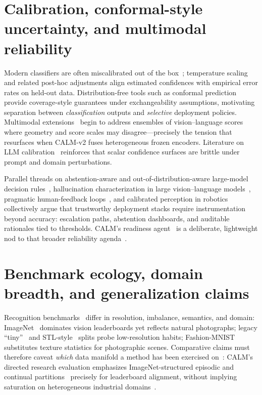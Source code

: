 \documentclass[12pt,a4paper]{report}
\begin{document}
\section{Calibration, conformal-style uncertainty, and multimodal reliability}
Modern classifiers are often miscalibrated out of the box~\cite{r5}; temperature scaling and related post-hoc adjustments align estimated confidences with empirical error rates on held-out data. Distribution-free tools such as conformal prediction~\cite{r10} provide coverage-style guarantees under exchangeability assumptions, motivating separation between \emph{classification} outputs and \emph{selective} deployment policies. Multimodal extensions~\cite{r21} begin to address ensembles of vision--language scores where geometry and score scales may disagree---precisely the tension that resurfaces when CALM-v2 fuses heterogeneous frozen encoders. Literature on LLM calibration~\cite{r26} reinforces that scalar confidence surfaces are brittle under prompt and domain perturbations.

Parallel threads on abstention-aware and out-of-distribution-aware large-model decision rules~\cite{r22}, hallucination characterization in large vision--language models~\cite{r23}, pragmatic human-feedback loops~\cite{r24}, and calibrated perception in robotics~\cite{r25} collectively argue that trustworthy deployment stacks require instrumentation beyond accuracy: escalation paths, abstention dashboards, and auditable rationales tied to thresholds. CALM's readiness agent~\cite{r5} is a deliberate, lightweight nod to that broader reliability agenda~\cite{r10,r24}.

\section{Benchmark ecology, domain breadth, and generalization claims}
Recognition benchmarks~\cite{r2,r28,r29,r30} differ in resolution, imbalance, semantics, and domain: ImageNet~\cite{r2} dominates vision leaderboards yet reflects natural photographs; legacy ``tiny''~\cite{r28} and STL-style~\cite{r29} splits probe low-resolution habits; Fashion-MNIST~\cite{r30} substitutes texture statistics for photographic scenes. Comparative claims must therefore caveat \emph{which} data manifold a method has been exercised on~\cite{r28,r29,r30}: CALM's directed research evaluation emphasizes ImageNet-structured episodic and continual partitions~\cite{r2} precisely for leaderboard alignment, without implying saturation on heterogeneous industrial domains~\cite{r27}.
\end{document}
